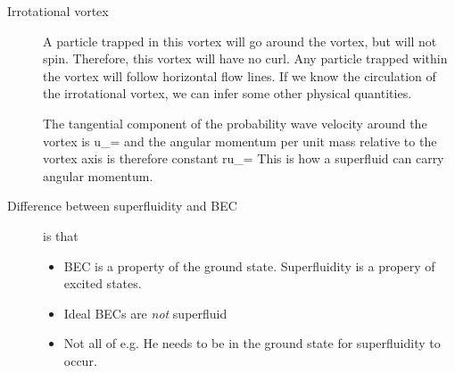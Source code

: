 \begin{description}
 
\item[Irrotational vortex] A particle trapped in this vortex will go around the vortex, but will not spin. Therefore, this vortex will have no curl. Any particle trapped within the vortex will follow horizontal flow lines. If we know the circulation of the irrotational vortex, we can infer some other physical quantities. 

The tangential component of the probability wave velocity around the vortex is
\beq
u_\theta = \frac{\Gamma}{2\pi}
\eeq
and the angular momentum per unit mass relative to the vortex axis is therefore constant
\beq
ru_\theta = \frac{\Gamma}{2\pi}
\eeq
This is how a superfluid can carry angular momentum. 

\item[Difference between superfluidity and BEC] is that
\begin{itemize}
\item BEC is a property of the ground state. Superfluidity is a propery of excited states. 
\item Ideal BECs are \emph{not} superfluid
\item Not all of e.g. He needs to be in the ground state for superfluidity to occur. 
\end{itemize}

\end{description}
